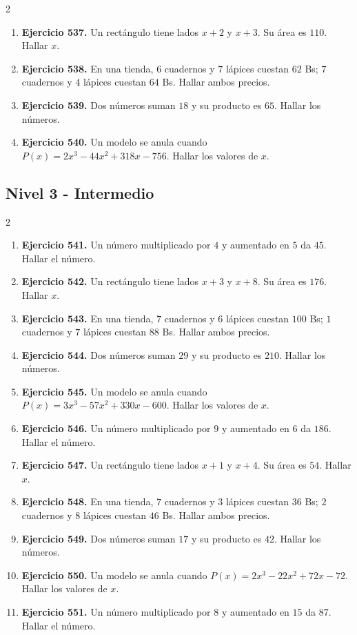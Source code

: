 \documentclass[10pt,a4paper]{article}
\newcommand{\nivel}[1]{\subsection*{#1}\addcontentsline{toc}{subsection}{#1}}
\begin{document}
\begin{multicols}{2}
\begin{enumerate}[label=\textbf{\arabic*.}]
\item \textbf{Ejercicio 537.} Un rectángulo tiene lados \(x+2\) y \(x+3\). Su área es \(110\). Hallar \(x\).
\item \textbf{Ejercicio 538.} En una tienda, \(6\) cuadernos y \(7\) lápices cuestan \(62\) Bs; \(7\) cuadernos y \(4\) lápices cuestan \(64\) Bs. Hallar ambos precios.
\item \textbf{Ejercicio 539.} Dos números suman \(18\) y su producto es \(65\). Hallar los números.
\item \textbf{Ejercicio 540.} Un modelo se anula cuando \(P(x)=2 x^{3} - 44 x^{2} + 318 x - 756\). Hallar los valores de \(x\).
\end{enumerate}
\end{multicols}
\nivel{Nivel 3 - Intermedio}
\begin{multicols}{2}
\begin{enumerate}[label=\textbf{\arabic*.}]
\item \textbf{Ejercicio 541.} Un número multiplicado por \(4\) y aumentado en \(5\) da \(45\). Hallar el número.
\item \textbf{Ejercicio 542.} Un rectángulo tiene lados \(x+3\) y \(x+8\). Su área es \(176\). Hallar \(x\).
\item \textbf{Ejercicio 543.} En una tienda, \(7\) cuadernos y \(6\) lápices cuestan \(100\) Bs; \(1\) cuadernos y \(7\) lápices cuestan \(88\) Bs. Hallar ambos precios.
\item \textbf{Ejercicio 544.} Dos números suman \(29\) y su producto es \(210\). Hallar los números.
\item \textbf{Ejercicio 545.} Un modelo se anula cuando \(P(x)=3 x^{3} - 57 x^{2} + 330 x - 600\). Hallar los valores de \(x\).
\item \textbf{Ejercicio 546.} Un número multiplicado por \(9\) y aumentado en \(6\) da \(186\). Hallar el número.
\item \textbf{Ejercicio 547.} Un rectángulo tiene lados \(x+1\) y \(x+4\). Su área es \(54\). Hallar \(x\).
\item \textbf{Ejercicio 548.} En una tienda, \(7\) cuadernos y \(3\) lápices cuestan \(36\) Bs; \(2\) cuadernos y \(8\) lápices cuestan \(46\) Bs. Hallar ambos precios.
\item \textbf{Ejercicio 549.} Dos números suman \(17\) y su producto es \(42\). Hallar los números.
\item \textbf{Ejercicio 550.} Un modelo se anula cuando \(P(x)=2 x^{3} - 22 x^{2} + 72 x - 72\). Hallar los valores de \(x\).
\item \textbf{Ejercicio 551.} Un número multiplicado por \(8\) y aumentado en \(15\) da \(87\). Hallar el número.

\end{enumerate}
\end{multicols}
\end{document}
